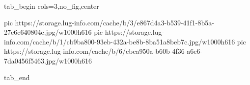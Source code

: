  
 
 
 
 


\ifcmt
  tab_begin cols=3,no_fig,center

     pic https://storage.lug-info.com/cache/b/3/e867d4a3-b539-41f1-8b5a-27c6c640804e.jpg/w1000h616%
		 pic https://storage.lug-info.com/cache/b/1/cb9ba800-93eb-432a-be8b-8ba51a8beb7c.jpg/w1000h616%
		 pic https://storage.lug-info.com/cache/b/6/cbca950a-b60b-4f36-a6e6-7da0456f5463.jpg/w1000h616%

  tab_end
\fi
